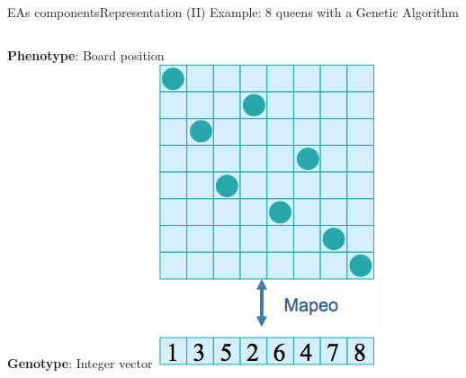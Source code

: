 \documentclass[10pt,compress]{beamer} %
\begin{document}
\begin{frame}{EAs components}{Representation (II)} 
	Example: 8 queens with a Genetic Algorithm
	\bigskip
    \begin{columns}
	   \textbf{Phenotype}: Board position\\
	   \textbf{Genotype}: Integer vector
		\includegraphics[width=0.7\linewidth]{figs/8queen.png}
	\end{columns}
\end{frame}
\end{document}
